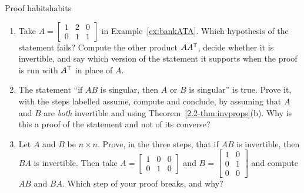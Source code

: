 \documentclass[11pt]{article}
\begin{document}
\begin{think}{Proof habits}{habits}
\begin{enumerate}[label=(\arabic*)]
  \item Take $A=\begin{bmatrix}1&2&0\\0&1&1\end{bmatrix}$ in Example~\ref{ex:bankATA}. Which hypothesis of the statement fails? Compute the other product $AA^{\mathsf T}$, decide whether it is invertible, and say which version of the statement it supports when the proof is run with $A^{\mathsf T}$ in place of $A$.
  \item The statement ``if $AB$ is singular, then $A$ or $B$ is singular'' is true. Prove it, with the steps labelled assume, compute and conclude, by assuming that $A$ and $B$ are \emph{both} invertible and using Theorem~\ref{2.2-thm:invprops}(b). Why is this a proof of the statement and not of its converse?
  \item Let $A$ and $B$ be $n\times n$. Prove, in the three steps, that if $AB$ is invertible, then $BA$ is invertible. Then take $A=\begin{bmatrix}1&0&0\\0&1&0\end{bmatrix}$ and $B=\begin{bmatrix}1&0\\0&1\\0&0\end{bmatrix}$ and compute $AB$ and $BA$. Which step of your proof breaks, and why?
\end{enumerate}
\end{think}
\end{document}
